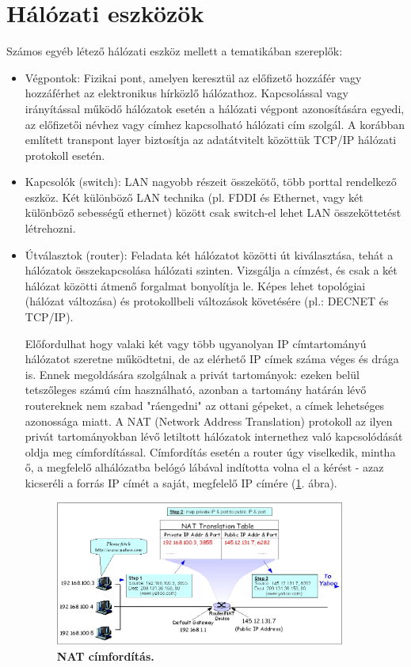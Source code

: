 \documentclass[12pt]{article}
\theoremstyle{plain}
\begin{document}
\section{Hálózati eszközök}

Számos egyéb létező hálózati eszköz mellett a tematikában szereplők:
\begin{itemize}
    \item Végpontok: Fizikai pont, amelyen keresztül az előfizető hozzáfér vagy hozzáférhet az elektronikus hírközlő hálózathoz. Kapcsolással vagy irányítással működő hálózatok esetén a hálózati végpont azonosítására egyedi, az előfizetői névhez vagy címhez kapcsolható hálózati cím szolgál. A korábban említett transpont layer biztosítja az adatátvitelt közöttük TCP/IP hálózati protokoll esetén.
    \item Kapcsolók (switch): LAN nagyobb részeit összekötő, több porttal rendelkező eszköz. Két különböző LAN technika (pl. FDDI és Ethernet, vagy két különböző sebességű ethernet) között csak switch-el lehet LAN összeköttetést létrehozni. 
    \item Útválasztok (router): Feladata két hálózatot közötti út kiválasztása, tehát a hálózatok összekapcsolása hálózati szinten. Vizsgálja a címzést, és csak a két hálózat közötti átmenő forgalmat bonyolítja le. Képes lehet topológiai (hálózat változása) és protokollbeli változások követésére (pl.: DECNET és TCP/IP). \par
    Előfordulhat hogy valaki két vagy több ugyanolyan IP címtartományú hálózatot szeretne működtetni, de az elérhető IP címek száma véges és drága is. Ennek megoldására szolgálnak a privát tartományok: ezeken belül tetszőleges számú cím használható, azonban a tartomány határán lévő routereknek nem szabad "ráengedni" az ottani gépeket, a címek lehetséges azonossága miatt.
    A NAT (Network Address Translation) protokoll az ilyen privát tartományokban lévő letiltott hálózatok internethez való kapcsolódását oldja meg címfordítással. Címfordítás esetén a router úgy viselkedik, mintha ő, a megfelelő alhálózatba belógó lábával indította  volna  el  a  kérést - azaz  kicseréli  a  forrás  IP  címét  a  saját,  megfelelő  IP címére (\ref{fig:nat}. ábra).
    
    \begin{figure}[H]
    \begin{center}
    \includegraphics[width=0.90\textwidth]{media/nat.jpg}
    \caption{\textbf{NAT címfordítás.}}
    \label{fig:nat}
    \end{center}
\end{figure}
    

\end{itemize}
\end{document}
